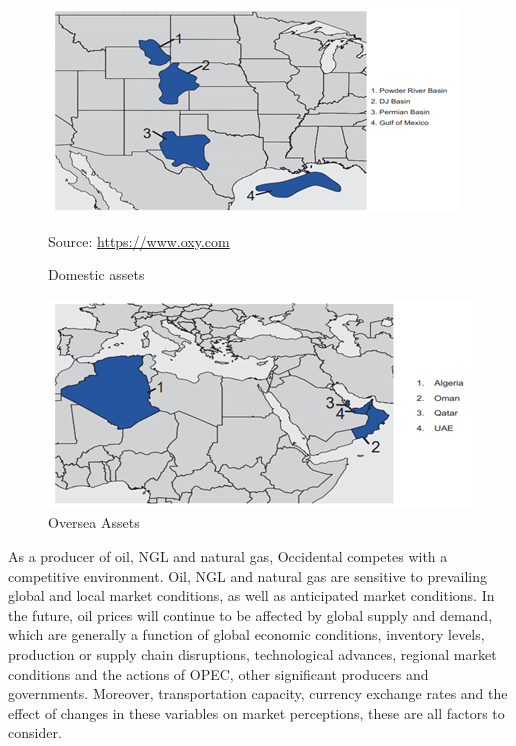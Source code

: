 \documentclass[
	a4paper, %
	12pt,%
]{CSSullivanBusinessReport}
\begin{document}
\begin{fullwidth}
\begin{figure}[H]
    \label{Comparative oil and gas proved reserves and sales volumes}
\end{figure}
\begin{figure}[H]
    \centering
    \includegraphics{Images/domestic assets.png}
    \caption{Domestic assets}
    Source: \url{https://www.oxy.com}
    \label{Domestic assets}
\end{figure}
\begin{figure}[H]
    \centering
    \includegraphics{Images/Oversea assets.png}
    \caption{Oversea Assets}
    \label{Oversea Assets}
\end{figure}
As a producer of oil, NGL and natural gas, Occidental competes with a competitive environment. Oil, NGL and natural gas are sensitive to prevailing global and local market conditions, as well as anticipated market conditions. In the future, oil prices will continue to be affected by global supply and demand, which are generally a function of global economic conditions, inventory levels, production or supply chain disruptions, technological advances, regional market conditions and the actions of OPEC, other significant producers and governments. Moreover, transportation capacity, currency exchange rates and the effect of changes in these variables on market perceptions, these are all factors to consider.
\begin{figure}[h]
    \centering

\end{figure}
\end{fullwidth}
\end{document}
